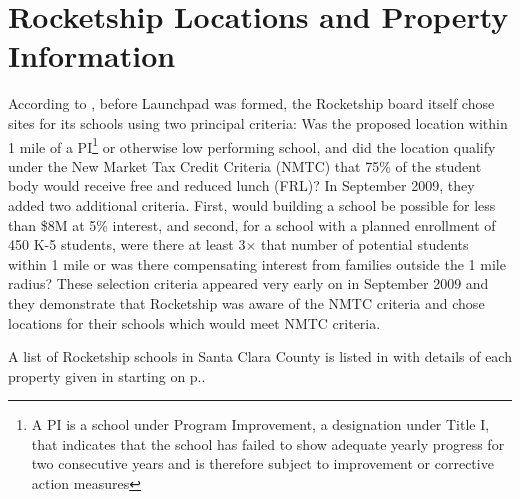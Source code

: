 \section{Rocketship Locations and Property Information}
\label{sec:location-and-property-info}\indent%

According to \textcite[7]{RSED2009c}, before Launchpad was formed, the Rocketship board itself chose sites for its schools using two principal criteria: Was the proposed location within 1 mile of a PI\footnote{A PI is a school under Program Improvement, a designation under Title I, that indicates that the school has failed to show adequate yearly progress for two consecutive years and is therefore subject to improvement or corrective action measures} or otherwise low performing school, and did the location qualify under the New Market Tax Credit Criteria (NMTC) that 75\% of the student body would receive free and reduced lunch (FRL)? In September 2009, they added two additional criteria. First, would building a school be possible for less than \$8M at 5\% interest, and second, for a school with a planned enrollment of 450 K-5 students, were there at least 3× that number of potential students within 1 mile or was there compensating interest from families outside the 1 mile radius? These selection criteria appeared very early on in September 2009  and they demonstrate that Rocketship was aware of the NMTC criteria and chose locations for their schools which would meet NMTC criteria.

A list of Rocketship schools in Santa Clara County is listed in  with details of each property given in   starting on p.\pageref{appx:rocketship-property-info}.

